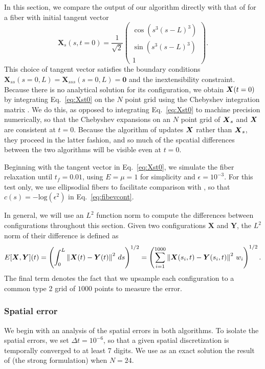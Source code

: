 In this section, we compare the output of our algorithm directly with that of \cite{ehssan17} for a fiber with initial tangent vector
\begin{equation}
\label{eq:Xst0}
\bm{X}_s(s,t=0) = \frac{1}{\sqrt{2}}\begin{pmatrix} \cos{\left(s^3 (s-L)^3\right)}\\[2 pt] \sin{\left(s^3(s-L)^3\right)}\\[2 pt] 1 \end{pmatrix}. 
\end{equation}
This choice of tangent vector satisfies the boundary conditions $\displaystyle \bm{X}_{ss}\left(s=0,L\right)=\bm{X}_{sss}\left(s=0,L\right)=\bm{0}$ and the inextensibility constraint. Because there is no analytical solution for its configuration, we obtain $\boldsymbol{X}(t=0)$ by integrating Eq.\ \eqref{eq:Xst0} on the $N$ point grid using the Chebyshev integration matrix \cite{greengard1991spectral}. We do this, as opposed to integrating Eq.\ \eqref{eq:Xst0} to machine precision numerically, so that the Chebyshev expansions on an $N$ point grid of $\boldsymbol{X}_s$ and $\boldsymbol{X}$ are consistent at $t=0$. Because the algorithm of \cite{ehssan17} updates $\boldsymbol{X}$ rather than $\boldsymbol{X}_s$, they proceed in the latter fashion, and so much of the spcatial differences between the two algorithms will be visible even at $t=0$. 

Beginning with the tangent vector in Eq.\ \eqref{eq:Xst0}, we simulate the fiber relaxation until $t_f=0.01$, using $E=\mu=1$ for simplicity and $\epsilon=10^{-3}$. For this test only, we use ellipsodial fibers to facilitate comparison with \cite{ehssan17}, so that $c(s)=-\text{log}(\epsilon^2)$ in Eq.\ \eqref{eq:fibevcont}. 

In general, we will use an $L^2$ function norm to compute the differences between configurations throughout this section. Given two configurations $\bm{X}$ and $\bm{Y}$, the $L^2$ norm of their difference is defined as
\begin{equation}
\label{eq:Errort}
E[\boldsymbol{X},\boldsymbol{Y}](t) = \left(\int_0^L \left\Vert \boldsymbol{X}(t)-\boldsymbol{Y}(t)\right\Vert^2 \, ds\right)^{1/2} = \left( \sum_{i=1}^{1000} \left\Vert \boldsymbol{X}(s_i,t)-\boldsymbol{Y}(s_i,t)\right\Vert^2 \, w_i  \right)^{1/2}. 
\end{equation}
The final term denotes the fact that we upsample each configuration to a common type 2 grid of $1000$ points to measure the error. 

\subsubsection{Spatial error}
We begin with an analysis of the spatial errors in both algorithms. To isolate the spatial errors, we set $\Delta t =10^{-6}$, so that a given spatial discretization is temporally converged to at least 7 digits. We use as an exact solution the result of \cite{ehssan17} (the strong formulation) when $N=24$.   

